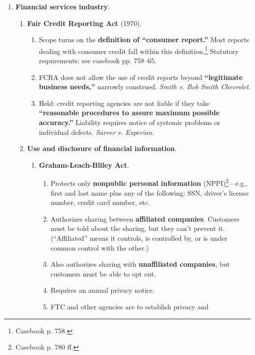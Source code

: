 \begin{enumerate}
    \item \textbf{Financial services industry}.
    \begin{enumerate}
        \item \textbf{Fair Credit Reporting Act} (1970).
        \begin{enumerate}
            \item Scope turns on the \textbf{definition of ``consumer 
            report.''} Most reports dealing with consumer credit fall within 
            this definition.\footnote{Casebook p. 758.} Statutory 
            requirements: see casebook pp. 758--65.
            \item FCRA does not allow the use of credit reports beyond 
            \textbf{``legitimate business needs,''} narrowly construed. 
            \emph{Smith v. Bob Smith Chevrolet}.
            \item Held: credit reporting agencies are not liable if they take 
            \textbf{``reasonable procedures to assure maximum possible 
            accuracy.''} Liability requires notice of systemic problems or 
            individual defects. \emph{Sarver v. Experian}.
        \end{enumerate}
        \item \textbf{Use and disclosure of financial information}.
        \begin{enumerate}
            \item \textbf{Graham-Leach-Bliley Act}.
            \begin{enumerate}
                \item Protects only \textbf{nonpublic personal information} 
                (NPPI)\footnote{Casebook p. 780 ff.}---e.g., first and last 
                name plus any of the following: SSN, driver's license number, 
                credit card number, etc.
                \item Authorizes sharing between \textbf{affiliated 
                companies}. Customers must be told about the sharing, but they 
                can't prevent it. (``Affiliated'' means it controls, is 
                controlled by, or is under common control with the other.)
                \item Also authorizes sharing with \textbf{unaffiliated 
                companies}, but customers must be able to opt out.
                \item Requires an annual privacy notice.
                \item FTC and other agencies are to establish privacy and 

\end{enumerate}
\end{enumerate}
\end{enumerate}
\end{enumerate}

